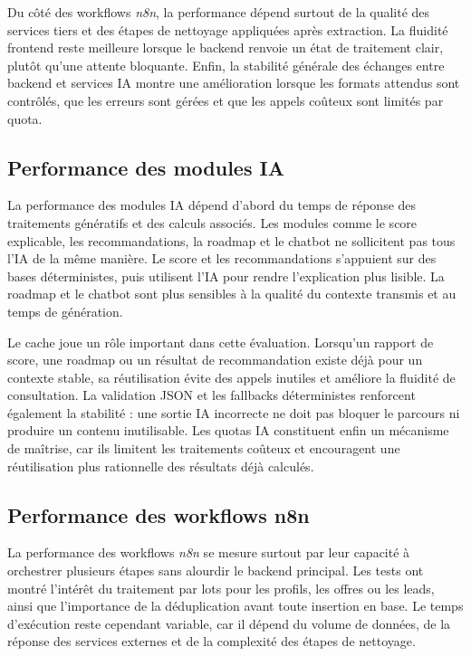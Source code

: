 Du côté des workflows \textit{n8n}, la performance dépend surtout de la qualité des services tiers et des étapes de nettoyage appliquées après extraction. La fluidité frontend reste meilleure lorsque le backend renvoie un état de traitement clair, plutôt qu'une attente bloquante. Enfin, la stabilité générale des échanges entre backend et services IA montre une amélioration lorsque les formats attendus sont contrôlés, que les erreurs sont gérées et que les appels coûteux sont limités par quota.

\subsection{Performance des modules IA}

La performance des modules IA dépend d'abord du temps de réponse des traitements génératifs et des calculs associés. Les modules comme le score explicable, les recommandations, la roadmap et le chatbot ne sollicitent pas tous l'IA de la même manière. Le score et les recommandations s'appuient sur des bases déterministes, puis utilisent l'IA pour rendre l'explication plus lisible. La roadmap et le chatbot sont plus sensibles à la qualité du contexte transmis et au temps de génération.

Le cache joue un rôle important dans cette évaluation. Lorsqu'un rapport de score, une roadmap ou un résultat de recommandation existe déjà pour un contexte stable, sa réutilisation évite des appels inutiles et améliore la fluidité de consultation. La validation JSON et les fallbacks déterministes renforcent également la stabilité : une sortie IA incorrecte ne doit pas bloquer le parcours ni produire un contenu inutilisable. Les quotas IA constituent enfin un mécanisme de maîtrise, car ils limitent les traitements coûteux et encouragent une réutilisation plus rationnelle des résultats déjà calculés.

\subsection{Performance des workflows n8n}

La performance des workflows \textit{n8n} se mesure surtout par leur capacité à orchestrer plusieurs étapes sans alourdir le backend principal. Les tests ont montré l'intérêt du traitement par lots pour les profils, les offres ou les leads, ainsi que l'importance de la déduplication avant toute insertion en base. Le temps d'exécution reste cependant variable, car il dépend du volume de données, de la réponse des services externes et de la complexité des étapes de nettoyage.

